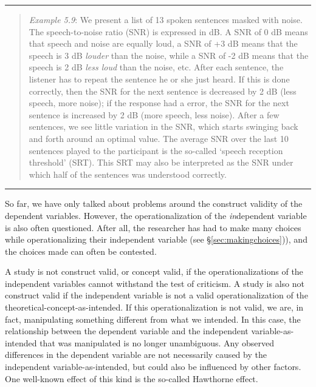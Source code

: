 \documentclass[
]{book}
\begin{document}
\begin{center}\rule{0.5\linewidth}{0.5pt}\end{center}

\begin{quote}
\emph{Example 5.9}: We present a list of 13 spoken sentences masked with noise. The speech-to-noise ratio (SNR) is expressed in dB. A SNR of 0 dB means that speech and noise are equally loud, a SNR of +3 dB means that the speech is 3 dB \emph{louder} than the noise, while a SNR of -2 dB means that the speech is 2 dB \emph{less loud} than the noise, etc. After each sentence, the listener has to repeat the sentence he or she just heard. If this is done correctly, then the SNR for the next sentence is decreased by 2 dB (less speech, more noise); if the response had a error, the SNR for the next sentence is increased by 2 dB (more speech, less noise). After a few sentences, we see little variation in the SNR, which starts swinging back and forth around an optimal value. The average SNR over the last 10 sentences played to the participant is the so-called `speech reception threshold' (SRT). This SRT may also be interpreted as the SNR under which half of the sentences was understood correctly.
\end{quote}

\begin{center}\rule{0.5\linewidth}{0.5pt}\end{center}

So far, we have only talked about problems around the construct validity of the dependent variables. However, the operationalization of the \emph{in}dependent variable is also often questioned. After all, the researcher has had to make many choices while operationalizing their independent variable (see §\ref{sec:makingchoices})), and the choices made can often be contested.

A study is not construct valid, or concept valid, if the operationalizations of the independent variables cannot withstand the test of criticism. A study is also not construct valid if the independent variable is not a valid operationalization of the theoretical-concept-as-intended. If this operationalization is not valid, we are, in fact, manipulating something different from what we intended. In this case, the relationship between the dependent variable and the independent variable-as-intended that was manipulated is no longer unambiguous. Any observed differences in the dependent variable are not necessarily caused by the independent variable-as-intended, but could also be influenced by other factors. One well-known effect of this kind is the so-called Hawthorne effect.
\end{document}
